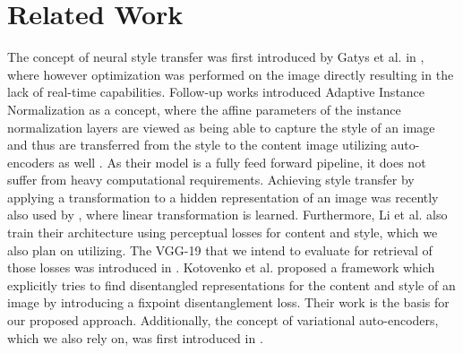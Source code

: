 \documentclass[twoside,twocolumn]{article}
\begin{document}
\section{Related Work}

The concept of neural style transfer was first introduced by Gatys et al. in \cite{gatys}, where however optimization was performed on the image directly resulting in the lack of real-time capabilities. Follow-up works introduced Adaptive Instance Normalization as a concept, where the affine parameters of the instance normalization layers are viewed as being able to capture the style of an image and thus are transferred from the style to the content image utilizing auto-encoders as well \cite{adain}. As their model is a fully feed forward pipeline, it does not suffer from heavy computational requirements. Achieving style transfer by applying a transformation to a hidden representation of an image was recently also used by \cite{linear}, where linear transformation is learned. Furthermore, Li et al. \cite{linear} also train their architecture using perceptual losses for content and style, which we also plan on utilizing. The VGG-19 that we intend to evaluate for retrieval of those losses was introduced in \cite{vgg19}. Kotovenko et al. proposed a framework which explicitly tries to find disentangled representations for the content and style of an image by introducing a fixpoint disentanglement loss. Their work \cite{Kotovenko_2019_ICCV} is the basis for our proposed approach. Additionally, the concept of variational auto-encoders, which we also rely on, was first introduced in \cite{vae}.

\printbibliography
\end{document}
